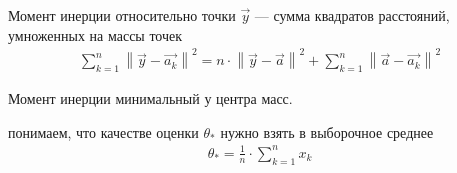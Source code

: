 \begin{example}
{        Момент инерции относительно точки $\vec{y}$ --- сумма квадратов
        расстояний, умноженных на массы точек
        \begin{align*}
            \sum_{k=1}^{n} \left\| \vec{y} - \vec{a_k} \right\|^2
            = n \cdot \left\| \vec{y} - \vec{a} \right\|^2
                + \sum_{k=1}^{n} \left\| \vec{a} - \vec{a_k} \right\|^2
        \end{align*}

        Момент инерции минимальный у центра масс.}
    понимаем, что качестве оценки $\theta_*$ нужно взять в выборочное среднее
    \begin{align*}
        \theta_* = \frac{1}{n} \cdot \sum_{k=1}^{n} x_k
    \end{align*}
\end{example}

